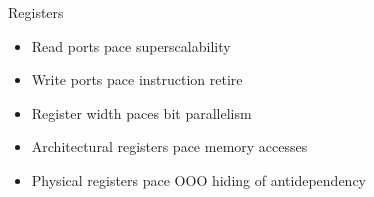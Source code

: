 \documentclass[xcolor={dvipsnames,table}]{beamer}
\begin{document}
\begin{frame}{Registers}
\begin{itemize}
\item Read ports pace superscalability
\item Write ports pace instruction retire
\item Register width paces bit parallelism
\item Architectural registers pace memory accesses
\item Physical registers pace OOO hiding of antidependency
\end{itemize}
\end{frame}
\end{document}
